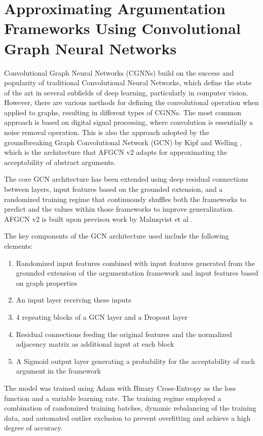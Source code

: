 \documentclass[conference]{IEEEtran}
\begin{document}
\section{Approximating Argumentation Frameworks Using Convolutional Graph Neural Networks}
\label{sec:headings}
Convolutional Graph Neural Networks \cite{Wu2020} (CGNNs) build on the success and popularity of traditional Convolutional Neural Networks, which define the state of the art in several subfields of deep learning, particularly in computer vision. However, there are various methods for defining the convolutional operation when applied to graphs, resulting in different types of CGNNs. The most common approach is based on digital signal processing, where convolution is essentially a noise removal operation. This is also the approach adopted by the groundbreaking Graph Convolutional Network (GCN) by Kipf and Welling \cite{Kipf2016}, which is the architecture that AFGCN v2 adapts for approximating the acceptability of abstract arguments.

The core GCN architecture has been extended using deep residual connections between layers, input features based on the grounded extension, and a randomized training regime that continuously shuffles both the frameworks to predict and the values within those frameworks to improve generalization. AFGCN v2 is built upon previsou work by Malmqvist et al \cite{malmqvistafgcn, malmqvist2022}.

The key components of the GCN architecture used include the following elements:
\begin{enumerate}
	\item Randomized input features combined with input features generated from the grounded extension of the argumentation framework and input features based on graph properties
	\item An input layer receiving these inputs
	\item 4 repeating blocks of a GCN layer \cite{Kipf2016} and a Dropout layer \cite{JMLR:v15:srivastava14a}
	\item Residual connections feeding the original features and the normalized adjacency matrix as additional input at each block
	\item A Sigmoid output layer generating a probability for the acceptability of each argument in the framework
\end{enumerate}
The model was trained using Adam \cite{Kingma2015} with Binary Cross-Entropy as the loss function and a variable learning rate. The training regime employed a combination of randomized training batches, dynamic rebalancing of the training data, and automated outlier exclusion to prevent overfitting and achieve a high degree of accuracy.
\end{document}
